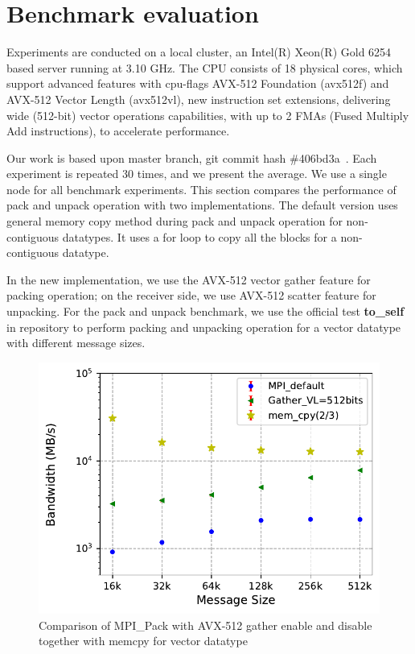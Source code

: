 \documentclass[conference]{IEEEtran}
\begin{document}
\section{Benchmark evaluation}\label{sec:experiments}
Experiments are conducted on a local cluster, an Intel(R) Xeon(R) Gold 6254 based server running
at 3.10 GHz. The CPU consists of 18 physical cores, which support advanced features with cpu-flags  AVX-512 Foundation (avx512f) and AVX-512 Vector Length (avx512vl), new instruction set extensions, delivering wide (512-bit) vector operations capabilities,
with up to 2 FMAs (Fused Multiply Add instructions), to accelerate performance.

Our work is based upon \ompi master branch, git commit hash \#406bd3a~\cite{ompigit}. Each experiment
is repeated 30 times, and we present the average. We use a single node for all benchmark experiments.
This section compares the performance of \mpi pack and unpack operation with two implementations.
The \ompi default version uses general memory copy method during pack and unpack operation for non-contiguous datatypes.
It uses a for loop to copy all the blocks for a non-contiguous datatype.

In the new implementation, we use the AVX-512 vector gather feature
for packing operation; on the receiver side, we use AVX-512 scatter feature for unpacking.
For the pack and unpack benchmark, we use the official test \textbf{to\_self} in \ompi repository
to perform packing and unpacking operation for a vector datatype with different message sizes.

\begin{figure}[h]
    \centering
    \includegraphics[width=\linewidth]{to_self_avx_gather_20tests_with_memcpy.pdf}
    \caption{Comparison of MPI\_Pack with AVX-512 gather enable and disable together with memcpy for vector datatype}
    \label{fig:gather20}
\end{figure}
\end{document}
